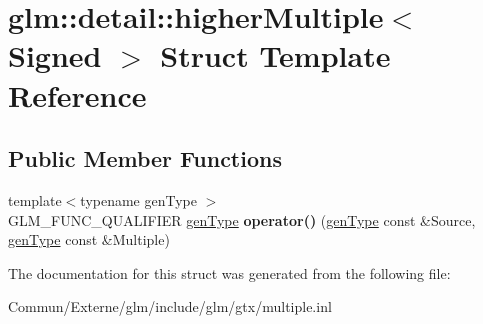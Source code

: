 \hypertarget{structglm_1_1detail_1_1higher_multiple}{}\section{glm\+:\+:detail\+:\+:higher\+Multiple$<$ Signed $>$ Struct Template Reference}
\label{structglm_1_1detail_1_1higher_multiple}
\subsection*{Public Member Functions}
\begin{DoxyCompactItemize}
\item 
{\footnotesize template$<$typename gen\+Type $>$ }\\G\+L\+M\+\_\+\+F\+U\+N\+C\+\_\+\+Q\+U\+A\+L\+I\+F\+I\+ER \hyperlink{structglm_1_1detail_1_1gen_type}{gen\+Type} {\bfseries operator()} (\hyperlink{structglm_1_1detail_1_1gen_type}{gen\+Type} const \&Source, \hyperlink{structglm_1_1detail_1_1gen_type}{gen\+Type} const \&Multiple)\hypertarget{structglm_1_1detail_1_1higher_multiple_a6361633200080a366cd84e43b30d70bb}{}\label{structglm_1_1detail_1_1higher_multiple_a6361633200080a366cd84e43b30d70bb}

\end{DoxyCompactItemize}


The documentation for this struct was generated from the following file\+:\begin{DoxyCompactItemize}
\item 
Commun/\+Externe/glm/include/glm/gtx/multiple.\+inl\end{DoxyCompactItemize}
